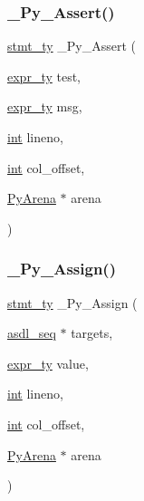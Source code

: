 \subsubsection{\texorpdfstring{\_Py\_Assert()}{\_Py\_Assert()}}
{\footnotesize\ttfamily \mbox{\hyperlink{_python-ast_8h_a39618071027b661bc03e8916e664e1a7}{stmt\+\_\+ty}} \+\_\+\+Py\+\_\+\+Assert (\begin{DoxyParamCaption}\item[{\mbox{\hyperlink{_python-ast_8h_a56d3705e020a071405094a220c4592bd}{expr\+\_\+ty}}}]{test,  }\item[{\mbox{\hyperlink{_python-ast_8h_a56d3705e020a071405094a220c4592bd}{expr\+\_\+ty}}}]{msg,  }\item[{\mbox{\hyperlink{warnings_8h_a74f207b5aa4ba51c3a2ad59b219a423b}{int}}}]{lineno,  }\item[{\mbox{\hyperlink{warnings_8h_a74f207b5aa4ba51c3a2ad59b219a423b}{int}}}]{col\+\_\+offset,  }\item[{\mbox{\hyperlink{pyarena_8h_a9edeb357fbb27333471022a0975adb7a}{Py\+Arena}} $\ast$}]{arena }\end{DoxyParamCaption})}

\mbox{\label{_python-ast_8h_ac35a8556d501c8658c9c2439952e50be}} 
\subsubsection{\texorpdfstring{\_Py\_Assign()}{\_Py\_Assign()}}
{\footnotesize\ttfamily \mbox{\hyperlink{_python-ast_8h_a39618071027b661bc03e8916e664e1a7}{stmt\+\_\+ty}} \+\_\+\+Py\+\_\+\+Assign (\begin{DoxyParamCaption}\item[{\mbox{\hyperlink{structasdl__seq}{asdl\+\_\+seq}} $\ast$}]{targets,  }\item[{\mbox{\hyperlink{_python-ast_8h_a56d3705e020a071405094a220c4592bd}{expr\+\_\+ty}}}]{value,  }\item[{\mbox{\hyperlink{warnings_8h_a74f207b5aa4ba51c3a2ad59b219a423b}{int}}}]{lineno,  }\item[{\mbox{\hyperlink{warnings_8h_a74f207b5aa4ba51c3a2ad59b219a423b}{int}}}]{col\+\_\+offset,  }\item[{\mbox{\hyperlink{pyarena_8h_a9edeb357fbb27333471022a0975adb7a}{Py\+Arena}} $\ast$}]{arena }\end{DoxyParamCaption})}

